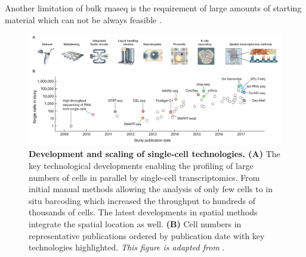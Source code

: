 Another limitation of bulk \gls{rnaseq} is the requirement of large amounts of starting material which can not be always feasible \textbf{\cite{kalisky_brief_2018}}.

\begin{figure}[H]
    \centering
    \includegraphics[width=\linewidth]{Chapter1/Fig/F1-5-02.png}
    \caption[Development and scaling of single-cell technologies]{\textbf{Development and scaling of single-cell technologies. (A)} The key technological developments enabling the profiling of large numbers of cells in parallel by single-cell transcriptomics. From initial manual methods allowing the analysis of only few cells to in situ barcoding which increased the throughput to hundreds of thousands of cells. The latest developments in spatial methods integrate the spatial location as well. \textbf{(B)} Cell numbers in representative publications ordered by publication date with key technologies highlighted. \textit{This figure is adapted from} \textbf{\cite{aldridge_single_2020,svensson_exponential_2018}}. }
    \label{fig:chp1_scrna-1}
\end{figure}


